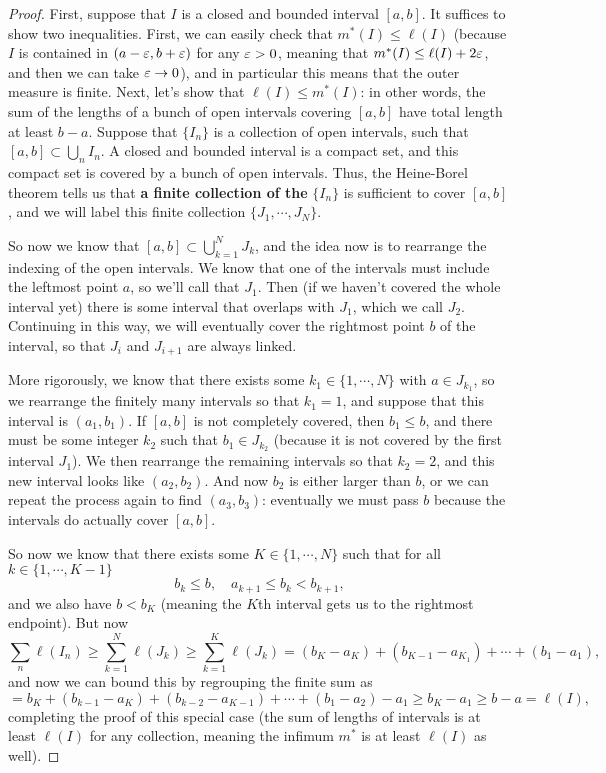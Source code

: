 \begin{proof}
First, suppose that $I$ is a closed and bounded interval $[a, b]$. It suffices to show two inequalities. First, we can easily check that $m^\ast(I) \le \ell(I)$ (because $I$ is contained in $(a - \varepsilon, b+\varepsilon)$ for any $\varepsilon > 0$, meaning that $m^\ast(I) \le \ell(I) + 2\varepsilon$, and then we can take $\varepsilon \to 0$), and in particular this means that the outer measure is finite. 
Next, let's show that $\ell(I) \le m^\ast(I)$: in other words, the sum of the lengths of a bunch of open intervals covering $[a, b]$ have total length at least $b-a$. Suppose that $\{I_n\}$ is a collection of open intervals, such that $[a, b] \subset \bigcup_n I_n$. A closed and bounded interval is a compact set, and this compact set is covered by a bunch of open intervals. Thus, the Heine-Borel theorem tells us that \textbf{a finite collection of the} $\{I_n\}$ is sufficient to cover $[a, b]$, and we will label this finite collection $\{J_1, \cdots, J_N\}$.

So now we know that $[a, b] \subset \bigcup_{k=1}^N J_k$, and the idea now is to rearrange the indexing of the open intervals. We know that one of the intervals must include the leftmost point $a$, so we'll call that $J_1$. Then (if we haven't covered the whole interval yet) there is some interval that overlaps with $J_1$, which we call $J_2$. Continuing in this way, we will eventually cover the rightmost point $b$ of the interval, so that $J_i$ and $J_{i+1}$ are always linked. 

More rigorously, we know that there exists some $k_1 \in \{1, \cdots, N\}$ with $a \in J_{k_1}$, so we rearrange the finitely many intervals so that $k_1 = 1$, and suppose that this interval is $(a_1, b_1)$. If $[a, b]$ is not completely covered, then $b_1 \le b$, and there must be some integer $k_2$ such that $b_1 \in J_{k_2}$ (because it is not covered by the first interval $J_1$). We then rearrange the remaining intervals so that $k_2 = 2$, and this new interval looks like $(a_2, b_2)$. And now $b_2$ is either larger than $b$, or we can repeat the process again to find $(a_3, b_3)$: eventually we must pass $b$ because the intervals do actually cover $[a, b]$. 

So now we know that there exists some $K \in \{1, \cdots, N\}$ such that for all $k \in \{1, \cdots, K-1\}$
\[
    b_k \le b, \quad a_{k+1} \le b_k < b_{k+1}, 
\]
and we also have $b < b_K$ (meaning the $K$th interval gets us to the rightmost endpoint). But now 
\[
    \sum_n \ell(I_n) \ge \sum_{k=1}^N \ell(J_k) \ge \sum_{k=1}^K \ell(J_k) = (b_K - a_K) + (b_{K-1} - a_{K_1}) + \cdots + (b_1 - a_1),
\]
and now we can bound this by regrouping the finite sum as
\[
    = b_K + (b_{k-1} - a_K) + (b_{k-2} - a_{K-1}) + \cdots + (b_1 - a_2) - a_1 \ge b_K - a_1 \ge b - a = \ell(I),
\]
completing the proof of this special case (the sum of lengths of intervals is at least $\ell(I)$ for any collection, meaning the infimum $m^\ast$ is at least $\ell(I)$ as well). 


\end{proof}
